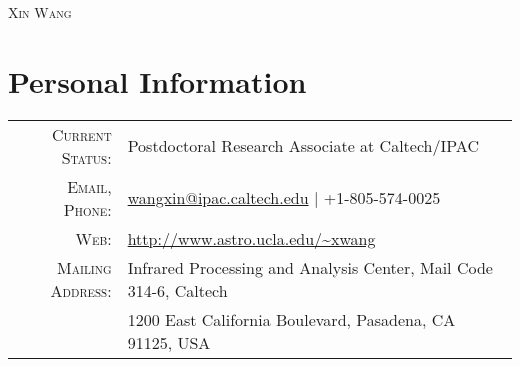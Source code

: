 \documentclass[letterpaper,12pt]{article}
\begin{document}
\par{\centering
  {\Large \textsc{Xin Wang}}
\par}

\vspace*{-.5em}
\section{Personal Information}
\vspace*{.8ex}
\begin{tabular}{rl}
    \textsc{Current Status:}  & Postdoctoral Research Associate at Caltech/IPAC    \\
    \textsc{Email, Phone:}  & \href{mailto:wangxin@ipac.caltech.edu}{wangxin@ipac.caltech.edu}  |  +1-805-574-0025  \\
    \textsc{Web:}  & \url{http://www.astro.ucla.edu/~xwang} \\
    \textsc{Mailing Address:} & Infrared Processing and Analysis Center, Mail Code 314-6, Caltech \\
                              & 1200 East California Boulevard, Pasadena, CA 91125, USA
\end{tabular}


\end{document}
